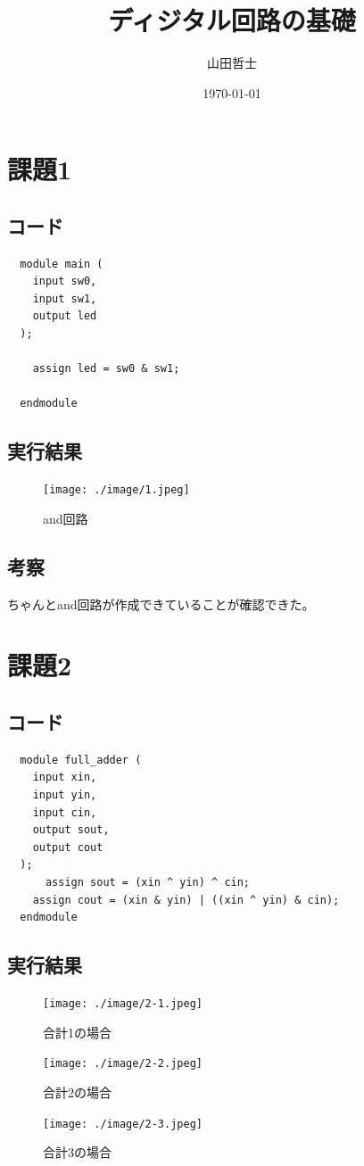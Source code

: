 \documentclass[uplatex]{jsarticle}
\title{ディジタル回路の基礎}%
\date{\today}%
\author{山田哲士}%
\begin{document}
\maketitle

\section{課題1}
\subsection{コード}
\begin{verbatim}
  module main (
    input sw0,
    input sw1,
    output led
  );

    assign led = sw0 & sw1;
    
  endmodule
\end{verbatim}

\subsection{実行結果}
\begin{figure}[hbtp]
  \centering
  \texttt{[image: ./image/1.jpeg]}
  \caption{and回路}
  \label{ラベル}
\end{figure}

\subsection{考察}
ちゃんとand回路が作成できていることが確認できた。

\section{課題2}
\subsection{コード}
\begin{verbatim}
  module full_adder (
    input xin,
    input yin,
    input cin,
    output sout,
    output cout
  );
      assign sout = (xin ^ yin) ^ cin;
    assign cout = (xin & yin) | ((xin ^ yin) & cin);
  endmodule  
\end{verbatim}

\subsection{実行結果}
\begin{figure}[hbtp]
  \centering
  \texttt{[image: ./image/2-1.jpeg]}
  \caption{合計1の場合}
  \label{ラベル}
\end{figure}
\clearpage
\begin{figure}[hbtp]
  \centering
  \texttt{[image: ./image/2-2.jpeg]}
  \caption{合計2の場合}
  \label{ラベル}
\end{figure}
\begin{figure}[hbtp]
  \centering
  \texttt{[image: ./image/2-3.jpeg]}
  \caption{合計3の場合}
  \label{ラベル}
\end{figure}
\end{document}
